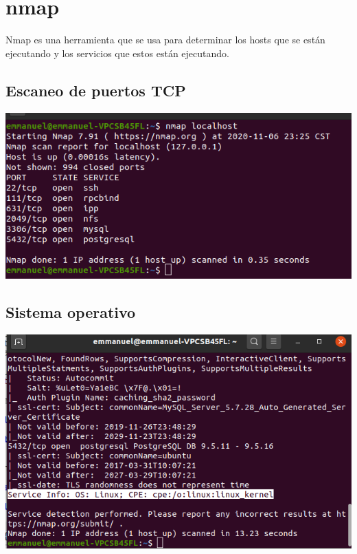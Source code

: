 \documentclass{article}
\begin{document}
\section{nmap}

Nmap es una herramienta que se usa para determinar los hosts que se están ejecutando y los servicios que estos están ejecutando.

\subsection{Escaneo de puertos TCP}

\includegraphics[width=\linewidth]{imagenes/puertos}

\subsection{Sistema operativo}

\includegraphics[width=\linewidth]{imagenes/sistema_operativo}
\end{document}

